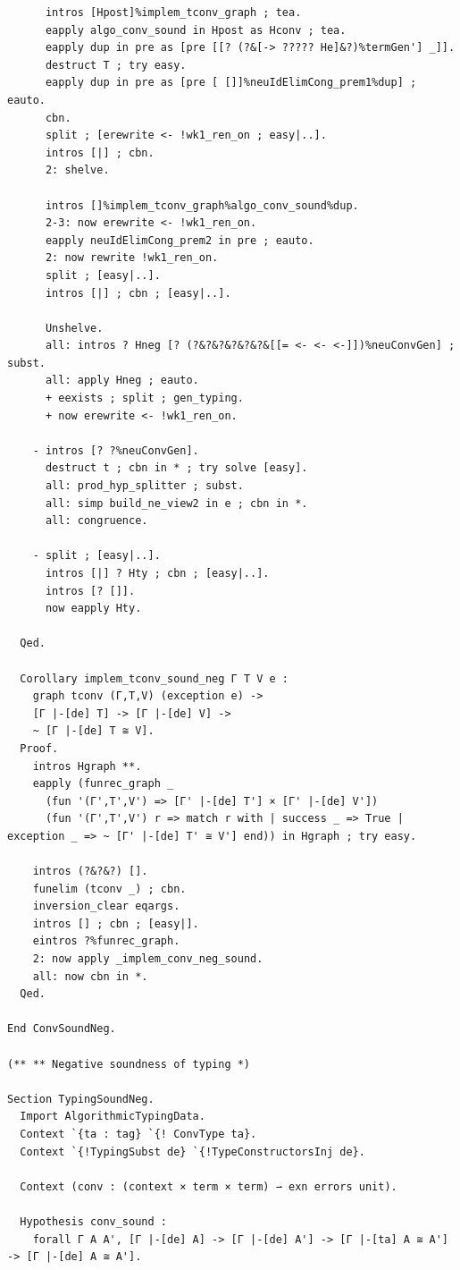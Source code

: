 \begin{lstlisting}
      intros [Hpost]%implem_tconv_graph ; tea.
      eapply algo_conv_sound in Hpost as Hconv ; tea.
      eapply dup in pre as [pre [[? (?&[-> ????? He]&?)%termGen'] _]].
      destruct T ; try easy.
      eapply dup in pre as [pre [ []]%neuIdElimCong_prem1%dup] ; eauto.
      cbn.
      split ; [erewrite <- !wk1_ren_on ; easy|..].
      intros [|] ; cbn.
      2: shelve.

      intros []%implem_tconv_graph%algo_conv_sound%dup.
      2-3: now erewrite <- !wk1_ren_on.
      eapply neuIdElimCong_prem2 in pre ; eauto.
      2: now rewrite !wk1_ren_on.
      split ; [easy|..].
      intros [|] ; cbn ; [easy|..].

      Unshelve.
      all: intros ? Hneg [? (?&?&?&?&?&?&[[= <- <- <-]])%neuConvGen] ; subst.
      all: apply Hneg ; eauto.
      + eexists ; split ; gen_typing.
      + now erewrite <- !wk1_ren_on. 

    - intros [? ?%neuConvGen].
      destruct t ; cbn in * ; try solve [easy].
      all: prod_hyp_splitter ; subst.
      all: simp build_ne_view2 in e ; cbn in *.
      all: congruence.
    
    - split ; [easy|..].
      intros [|] ? Hty ; cbn ; [easy|..].
      intros [? []].
      now eapply Hty.

  Qed.

  Corollary implem_tconv_sound_neg Γ T V e :
    graph tconv (Γ,T,V) (exception e) ->
    [Γ |-[de] T] -> [Γ |-[de] V] ->
    ~ [Γ |-[de] T ≅ V].
  Proof.
    intros Hgraph **.
    eapply (funrec_graph _
      (fun '(Γ',T',V') => [Γ' |-[de] T'] × [Γ' |-[de] V'])
      (fun '(Γ',T',V') r => match r with | success _ => True | exception _ => ~ [Γ' |-[de] T' ≅ V'] end)) in Hgraph ; try easy.
    
    intros (?&?&?) [].
    funelim (tconv _) ; cbn.
    inversion_clear eqargs.
    intros [] ; cbn ; [easy|].
    eintros ?%funrec_graph.
    2: now apply _implem_conv_neg_sound.
    all: now cbn in *.
  Qed.

End ConvSoundNeg.

(** ** Negative soundness of typing *)

Section TypingSoundNeg.
  Import AlgorithmicTypingData.
  Context `{ta : tag} `{! ConvType ta}.
  Context `{!TypingSubst de} `{!TypeConstructorsInj de}.

  Context (conv : (context × term × term) ⇀ exn errors unit).

  Hypothesis conv_sound :
    forall Γ A A', [Γ |-[de] A] -> [Γ |-[de] A'] -> [Γ |-[ta] A ≅ A'] -> [Γ |-[de] A ≅ A'].


\end{lstlisting}
